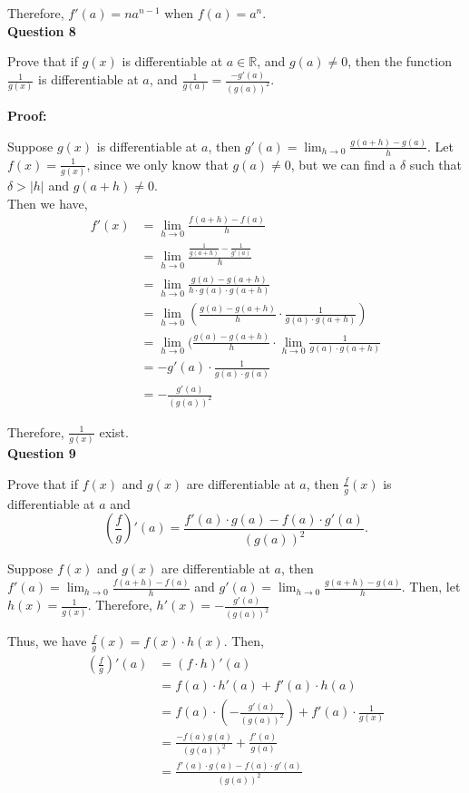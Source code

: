 \documentclass[a4paper,12pt]{report}
\begin{document}
Therefore, $f'(a)=na^{n-1}$ when $f(a)=a^n$.\\

\noindent
\textbf{Question 8}

\noindent
Prove that if $g(x)$ is differentiable at $a\in \mathbb{R}$, and $g(a)\neq 0$, then the function $\frac{1}{g(x)}$ is differentiable at $a$, and $\frac{1}{g(a)}=\frac{-g'(a)}{(g(a))^2}$. 

\noindent
\textbf{Proof: }

\noindent
Suppose $g(x)$ is differentiable at $a$, then $g'(a)=\displaystyle{\lim_{h\to 0}}\frac{g(a+h)-g(a)}{h}$. Let $f(x)=\frac{1}{g(x)}$, since we only know that $g(a)\neq 0$, but we can find a $\delta$ such that $\delta>|h|$ and $g(a+h)\neq 0$.\\

\noindent
Then we have, 
\begin{align*}
f'(x)&=\displaystyle{\lim_{h\to 0}}\frac{f(a+h)-f(a)}{h}\\
&=\displaystyle{\lim_{h\to 0}}\frac{\frac{1}{g(a+h)}-\frac{1}{g'(a)}}{h}\\
&=\displaystyle{\lim_{h\to 0}}\frac{g(a)-g(a+h)}{h\cdot{g(a)\cdot{g(a+h)}}}\\
&=\displaystyle{\lim_{h\to 0}}(\frac{g(a)-g(a+h)}{h}\cdot{\frac{1}{g(a)\cdot{g(a+h)}}})\\
&=\displaystyle{\lim_{h\to 0}}(\frac{g(a)-g(a+h)}{h}\cdot{\displaystyle{\lim_{h\to 0}}\frac{1}{g(a)\cdot{g(a+h)}}}\\
&=-g'(a)\cdot{\frac{1}{g(a)\cdot{g(a)}}}\\
&=-\frac{g'(a)}{(g(a))^2}
\end{align*}

\noindent
Therefore, $\frac{1}{g(x)}$ exist. \\

\noindent
\textbf{Question 9}

\noindent
Prove that if $f(x)$ and $g(x)$ are differentiable at $a$, then $\frac{f}{g}(x)$ is differentiable at $a$ and \[(\frac{f}{g})'(a) = \frac{f'(a)\cdot{g(a)}-f(a)\cdot{g'(a)}}{(g(a))^2}.\]

\noindent
Suppose $f(x)$ and $g(x)$ are differentiable at $a$, then $f'(a)=\displaystyle{\lim_{h\to 0}}\frac{f(a+h)-f(a)}{h}$ and $g'(a)=\displaystyle{\lim_{h\to 0}}\frac{g(a+h)-g(a)}{h}$. Then, let $h(x) = \frac{1}{g(x)}$. Therefore, $h'(x)=-\frac{g'(a)}{(g(a))^2}$ 

\noindent
Thus, we have $\frac{f}{g}(x)=f(x)\cdot{h(x)}$. Then, 
\begin{align*}
(\frac{f}{g})'(a)&=(f\cdot{h})'(a)\\
&= f(a)\cdot{h'(a)}+f'(a)\cdot{h(a)}\\
&= f(a)\cdot{(-\frac{g'(a)}{(g(a))^2})} + f'(a)\cdot{\frac{1}{g(x)}}\\
&= \frac{-f(a)g(a)}{(g(a))^2}+\frac{f'(a)}{g(a)}\\
&=\frac{f'(a)\cdot{g(a)}-f(a)\cdot{g'(a)}}{(g(a))^2}
\end{align*}
\end{document}
